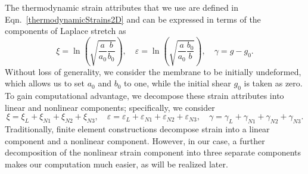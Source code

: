 The thermodynamic strain attributes that we use are defined in Eqn.~\eqref{thermodynamicStrains2D} and can be expressed in terms of the components of Laplace stretch as
\begin{equation}
    \xi = \ln\left( \sqrt{\frac{a}{a_0} \frac{b}{b_0}} \right) ,
    \quad
    \varepsilon = \ln\left(\sqrt{\frac{a}{a_0} \frac{b_0}{b}} \right) ,
    \quad 
    \gamma = g - g_0.
    \label{strainAttributesPentagon}
\end{equation}
Without loss of generality, we consider the membrane to be initially undeformed, which allows us to set $a_0$ and $b_0$ to one, while the initial shear $g_0$ is taken as zero.  To gain computational advantage, we decompose these strain attributes into linear and nonlinear components; specifically, we consider
\begin{equation}
    \xi = \xi_{L} + \xi_{N1} + \xi_{N2} + \xi_{N3} , \quad
    \varepsilon = \varepsilon_{L} + \varepsilon_{N1} + \varepsilon_{N2} + \varepsilon_{N3} , \quad
    \gamma = \gamma_{L} + \gamma_{N1} + \gamma_{N2} + \gamma_{N3}.
    \label{totalVirtualStrain}
\end{equation}
Traditionally, finite element constructions decompose strain into a linear component and a non\-linear component.  However, in our case, a further decomposition of the non\-linear strain component into three separate components makes our computation much easier, as will be realized later. 

